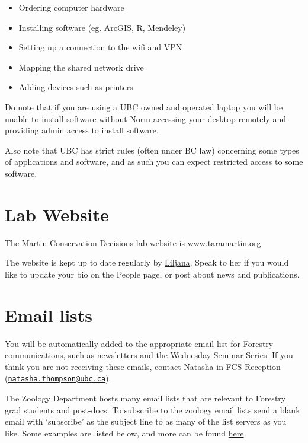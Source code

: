 \documentclass[
]{book}
\providecommand{\tightlist}{%
  \setlength{\itemsep}{0pt}\setlength{\parskip}{0pt}}
\begin{document}
\begin{itemize}
\tightlist
\item
  Ordering computer hardware
\item
  Installing software (eg. ArcGIS, R, Mendeley)
\item
  Setting up a connection to the wifi and VPN
\item
  Mapping the shared network drive
\item
  Adding devices such as printers
\end{itemize}

Do note that if you are using a UBC owned and operated laptop you will be unable to install software without Norm accessing your desktop remotely and providing admin access to install software.

Also note that UBC has strict rules (often under BC law) concerning some types of applications and software, and as such you can expect restricted access to some software.

\hypertarget{labwebsite}{%
\section*{Lab Website}\label{labwebsite}}

The Martin Conservation Decisions lab website is \url{www.taramartin.org}

The website is kept up to date regularly by \href{mailto:liljanameadmartin@gmail.com}{Liljana}. Speak to her if you would like to update your bio on the People page, or post about news and publications.

\hypertarget{emaillists}{%
\section*{Email lists}\label{emaillists}}

You will be automatically added to the appropriate email list for Forestry communications, such as newsletters and the Wednesday Seminar Series. If you think you are not receiving these emails, contact Natasha in FCS Reception (\href{mailto:natasha.thompson@ubc.ca}{\nolinkurl{natasha.thompson@ubc.ca}}).

The Zoology Department hosts many email lists that are relevant to Forestry grad students and post-docs. To subscribe to the zoology email lists send a blank email with `subscribe' as the subject line to as many of the list servers as you like. Some examples are listed below, and more can be found \href{https://www.zoology.ubc.ca/~bio310/noticeboard_files/listservs.htm}{here}.
\end{document}
